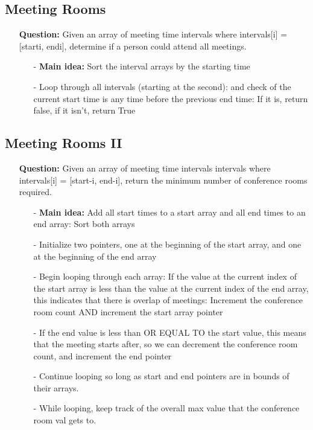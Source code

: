 \documentclass[12pt]{article}
\begin{document}
\subsection{Meeting Rooms}
\begin{enumerate}
  \item[] \textbf{Question:} Given an array of meeting time intervals where intervals[i] = [starti, endi], determine if a person could attend all meetings.

    \begin{enumerate}
      \item[-] \textbf{Main idea:} Sort the interval arrays by the starting time
      \item[-] Loop through all intervals (starting at the second): and check of the current start time is any time before the previous end time: If it is, return false, if it isn't, return True

    \end{enumerate}
\end{enumerate}

\subsection{Meeting Rooms II}
\begin{enumerate}
  \item[] \textbf{Question:} Given an array of meeting time intervals intervals where intervals[i] = [start-i, end-i], return the minimum number of conference rooms required.

    \begin{enumerate}
      \item[-] \textbf{Main idea:} Add all start times to a start array and all end times to an end array: Sort both arrays
      \item[-] Initialize two pointers, one at the beginning of the start array, and one at the beginning of the end array
      \item[-] Begin looping through each array: If the value at the current index of the start array is less than the value at the current index of the end array, this indicates that there is overlap of meetings: Increment the conference room count AND increment the start array pointer
      \item[-] If the end value is less than OR EQUAL TO the start value, this means that the meeting starts after, so we can decrement the conference room count, and increment the end pointer
      \item[-] Continue looping so long as start and end pointers are in bounds of their arrays. 
      \item[-] While looping, keep track of the overall max value that the conference room val gets to.

    \end{enumerate}
\end{enumerate}
\end{document}
